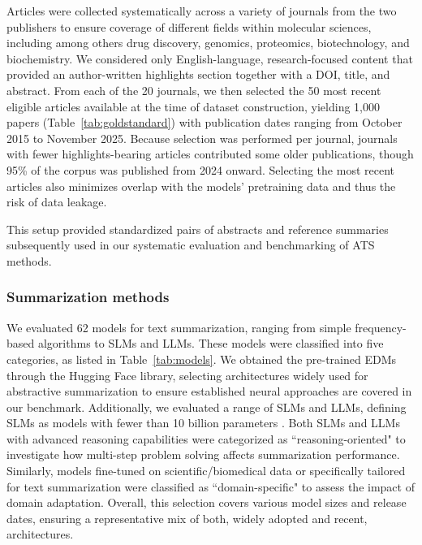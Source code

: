 Articles were collected systematically across a variety of journals from the two publishers to ensure coverage of different fields within molecular sciences, including among others drug discovery, genomics, proteomics, biotechnology, and biochemistry. We considered only English-language, research-focused content that provided an author-written highlights section together with a DOI, title, and abstract. From each of the 20 journals, we then selected the 50 most recent eligible articles available at the time of dataset construction, yielding 1,000 papers (Table~\ref{tab:goldstandard}) with publication dates ranging from October 2015 to November 2025. Because selection was performed per journal, journals with fewer highlights-bearing articles contributed some older publications, though 95\% of the corpus was published from 2024 onward. Selecting the most recent articles also minimizes overlap with the models' pretraining data and thus the risk of data leakage.

This setup provided standardized pairs of abstracts and reference summaries subsequently used in our systematic evaluation and benchmarking of \ac{ATS} methods.

\subsubsection{Summarization methods}

We evaluated 62 models for text summarization, ranging from simple frequency-based algorithms to \acp{SLM} and \acp{LLM}. These models were classified into five categories, as listed in Table~\ref{tab:models}. We obtained the pre-trained \acp{EDM} through the Hugging Face library, selecting architectures widely used for abstractive summarization to ensure established neural approaches are covered in our benchmark. Additionally, we evaluated a range of \acp{SLM} and \acp{LLM}, defining \acp{SLM} as models with fewer than 10 billion parameters \cite{belcak2025smalllanguagemodelsfuture}. Both \acp{SLM} and \acp{LLM} with advanced reasoning capabilities were categorized as ``reasoning-oriented" to investigate how multi-step problem solving affects summarization performance. Similarly, models fine-tuned on scientific/biomedical data or specifically tailored for text summarization were classified as ``domain-specific" to assess the impact of domain adaptation. Overall, this selection covers various model sizes and release dates, ensuring a representative mix of both, widely adopted and recent, architectures.

